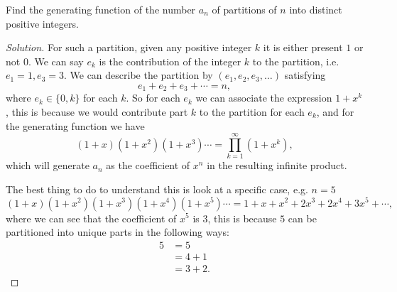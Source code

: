 \documentclass[10pt, a4paper]{article}
\begin{document}
\begin{example}
    Find the generating function of the number $a_n$ of partitions of $n$ into distinct positive integers.
    \begin{proof}[Solution]\renewcommand{\qedsymbol}{}
        For such a partition,
        given any positive integer $k$ it is either present $1$ or not $0$.
        We can say $e_k$ is the contribution of the integer $k$ to the partition,
        i.e. $e_1 = 1, e_3 = 3$.
        We can describe the partition by $(e_1, e_2, e_3, \dotsc)$ satisfying
        \[
        e_1 + e_2 + e_3 + \dotsi = n,
        \]
        where $e_k \in \{0, k\}$ for each $k$.
        So for each $e_k$ we can associate the expression $1 + x ^ k$,
        this is because we would contribute part $k$ to the partition for each $e_k$,
        and for the generating function we have
        \[
        (1 + x)(1 + x ^ 2)(1 + x ^ 3) \dotsi = \prod_{k = 1}^{\infty}(1 + x ^ k),
        \]
        which will generate $a_n$ as the coefficient of $x ^ n$ in the resulting infinite product.

        The best thing to do to understand this is look at a specific case,
        e.g. $n = 5$
        \[
        (1 + x)(1 + x ^ 2)(1 + x ^ 3)(1 + x ^ 4)(1 + x ^ 5) \dotsi = 1 + x + x ^ 2 + 2x ^ 3 + 2x ^ 4 + 3x ^ 5 + \dotsi,
        \]
        where we can see that the coefficient of $x ^ 5$ is $3$,
        this is because $5$ can be partitioned into unique parts in the following ways: 
        \begin{align*}
            5 &= 5 \\
            &= 4 + 1 \\
            &= 3 + 2.
        \end{align*}
    \end{proof}
\end{example}
\end{document}
